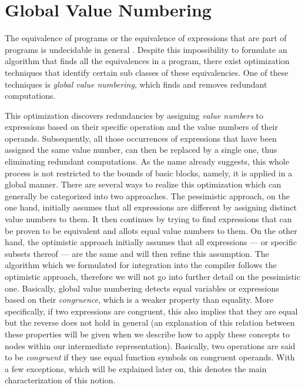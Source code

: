 \section{Global Value Numbering}
\label{sec:global-value-numbering}

The equivalence of programs or the equivalence of expressions that are part of programs is undecidable in general \cite{alpern:1988:detecting-equality-of-variables}. Despite this impossibility to formulate an algorithm that finds all the equivalences in a program, there exist optimization techniques that identify certain sub classes of these equivalencies. One of these techniques is \emph{global value numbering}, which finds and removes redundant computations.

This optimization discovers redundancies by assigning \emph{value numbers} to expressions based on their specific operation and the value numbers of their operands. Subsequently, all those occurrences of expressions that have been assigned the same value number, can then be replaced by a single one, thus eliminating redundant computations. As the name already suggests, this whole process is not restricted to the bounds of basic blocks, namely, it is applied in a global manner. There are several ways to realize this optimization which can generally be categorized into two approaches. The pessimistic approach, on the one hand, initially assumes that all expressions are different by assigning distinct value numbers to them. It then continues by trying to find expressions that can be proven to be equivalent and allots equal value numbers to them. On the other hand, the optimistic approach initially assumes that all expressions --- or specific subsets thereof --- are the same and will then refine this assumption. The algorithm which we formulated for integration into the compiler follows the optimistic approach, therefore we will not go into further detail on the pessimistic one.
\newpage
Basically, global value numbering detects equal variables or expressions based on their \emph{congruence}, which is a weaker property than equality. More specifically, if two expressions are congruent, this also implies that they are equal but the reverse does not hold in general (an explanation of this relation between these properties will be given when we describe how to apply these concepts to nodes within our intermediate representation). Basically, two operations are said to be \emph{congruent} if they use equal function symbols on congruent operands. With a few exceptions, which will be explained later on, this denotes the main characterization of this notion. 

